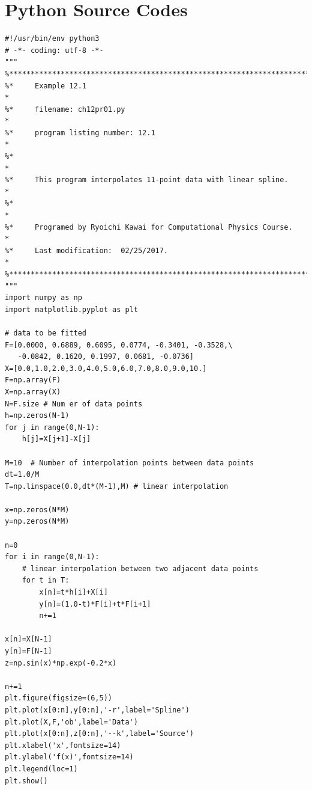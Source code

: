 
\bigskip
\noindent
\section*{Python Source Codes}
\setcounter{program}{0}

\bigskip
\noindent
\program
\footnotesize
\begin{verbatim}
#!/usr/bin/env python3
# -*- coding: utf-8 -*-
"""
%**************************************************************************
%*     Example 12.1                                                       *
%*     filename: ch12pr01.py                                              *
%*     program listing number: 12.1                                       *
%*                                                                        *
%*     This program interpolates 11-point data with linear spline.        *
%*                                                                        *
%*     Programed by Ryoichi Kawai for Computational Physics Course.       *
%*     Last modification:  02/25/2017.                                    *
%**************************************************************************
"""
import numpy as np
import matplotlib.pyplot as plt

# data to be fitted
F=[0.0000, 0.6889, 0.6095, 0.0774, -0.3401, -0.3528,\
   -0.0842, 0.1620, 0.1997, 0.0681, -0.0736]
X=[0.0,1.0,2.0,3.0,4.0,5.0,6.0,7.0,8.0,9.0,10.]
F=np.array(F)
X=np.array(X)
N=F.size # Num er of data points
h=np.zeros(N-1)
for j in range(0,N-1):
    h[j]=X[j+1]-X[j]

M=10  # Number of interpolation points between data points
dt=1.0/M
T=np.linspace(0.0,dt*(M-1),M) # linear interpolation

x=np.zeros(N*M)
y=np.zeros(N*M)

n=0
for i in range(0,N-1):
    # linear interpolation between two adjacent data points
    for t in T:
        x[n]=t*h[i]+X[i]
        y[n]=(1.0-t)*F[i]+t*F[i+1]
        n+=1

x[n]=X[N-1]
y[n]=F[N-1]
z=np.sin(x)*np.exp(-0.2*x)

n+=1
plt.figure(figsize=(6,5))
plt.plot(x[0:n],y[0:n],'-r',label='Spline')
plt.plot(X,F,'ob',label='Data')
plt.plot(x[0:n],z[0:n],'--k',label='Source')
plt.xlabel('x',fontsize=14)
plt.ylabel('f(x)',fontsize=14)
plt.legend(loc=1)
plt.show()
\end{verbatim}
\normalsize


